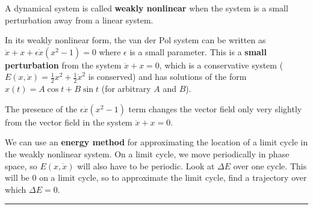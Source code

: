 \documentclass[12pt,letterpaper,noanswers]{exam}
\begin{document}
\begin{tcolorbox}
A dynamical system is called \textbf{weakly nonlinear} when the system is a small perturbation away from a linear system.  

In its weakly nonlinear form, the van der Pol system can be written as $\ddot x + x + \epsilon \dot x(x^2-1) = 0$ where $\epsilon$ is a small parameter.  This is a \textbf{small perturbation} from the system $\ddot x + x = 0$, which is a conservative system ($E(x,\dot x) = \frac{1}{2}x^2 + \frac{1}{2}\dot x^2$ is conserved) and has solutions of the form $x(t) = A\cos t + B\sin t$ (for arbitrary $A$ and $B$).

The presence of the $\epsilon \dot x (x^2-1)$ term changes the vector field only very slightly from the vector field in the system $\ddot x + x = 0$.

We can use an \textbf{energy method} for approximating the location of a limit cycle in the weakly nonlinear system.  On a limit cycle, we move periodically in phase space, so $E(x,\dot x)$ will also have to be periodic.  Look at $\Delta E$ over one cycle.  This will be $0$ on a limit cycle, so to approximate the limit cycle, find a trajectory over which $\Delta E = 0$.
\end{tcolorbox}



\vspace{0.2cm}
\hrule
\vspace{0.2cm}
\end{document}
